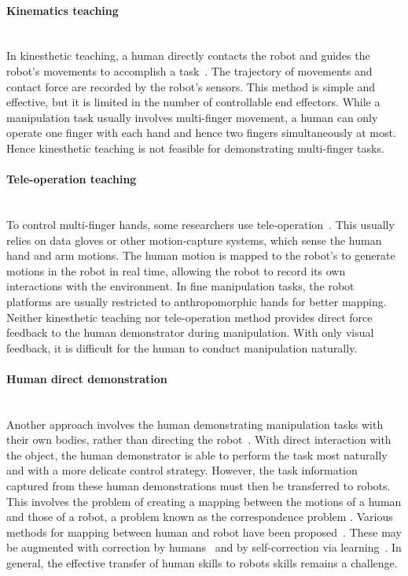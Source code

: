 \paragraph{Kinematics teaching} ~\\
In kinesthetic
teaching, a human directly contacts the robot and guides the robot's
movements to accomplish a
task~\citep{korkinof2013online,pais2014encoding,pastor2011skill,Miao2014}. The
trajectory of movements and contact force are recorded by the robot's
sensors.
This method is simple and effective, but it is limited in the number
of controllable end effectors. %
While a manipulation task usually involves multi-finger movement, a
human can only operate one finger with each hand and hence
two fingers simultaneously at most. Hence kinesthetic teaching is not feasible for demonstrating multi-finger tasks.

\paragraph{Tele-operation teaching} ~\\
To control multi-finger hands,
some researchers use
tele-operation~\citep{bernardino2013precision,kondo2008recognition,Fischer1998}.
This usually relies on data gloves or other motion-capture systems, which
sense the human hand and arm motions. The human motion is mapped to
the robot's to generate motions in the robot in real time, allowing
the robot to record its own interactions with the environment.
In fine manipulation tasks, the robot platforms are usually restricted
to anthropomorphic hands for better mapping.
Neither kinesthetic teaching nor
tele-operation method provides direct force
feedback to the human demonstrator during manipulation. With only visual feedback,
it is difficult for the human to conduct manipulation naturally.

\paragraph{Human direct demonstration} ~\\
Another approach involves the human demonstrating manipulation tasks
with their own bodies, rather than directing the
robot~\citep{asfour2008imitation}. With direct interaction with the
object, the human demonstrator is able to perform the task most
naturally and with a more delicate control strategy. However, the task
information captured from these human demonstrations must then be
transferred to robots. This involves the problem of creating a mapping
between the motions of a human and those of a robot, a problem known
as the correspondence problem \citep{Nehaniv02}.
Various methods for mapping between human and
robot have been
proposed~\citep{hueser2006learning,asfour2008imitation,do2011towards}. These may be augmented with correction by humans~\citep{calinon2007incremental,sauser2011iterative,romano2011human}
and by self-correction via learning~\citep{bidan2013robio}. In general, the effective transfer of human skills to robots skills remains a challenge.

